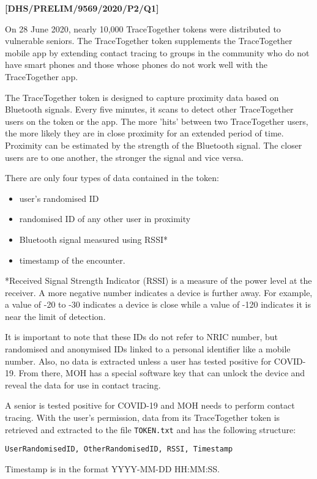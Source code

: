 \item \textbf{{[}DHS/PRELIM/9569/2020/P2/Q1{]} }

On 28 June 2020, nearly 10,000 TraceTogether tokens were distributed
to vulnerable seniors. The TraceTogether token supplements the TraceTogether
mobile app by extending contact tracing to groups in the community
who do not have smart phones and those whose phones do not work well
with the TraceTogether app. 

The TraceTogether token is designed to capture proximity data based
on Bluetooth signals. Every five minutes, it scans to detect other
TraceTogether users on the token or the app. The more 'hits' between
two TraceTogether users, the more likely they are in close proximity
for an extended period of time. Proximity can be estimated by the
strength of the Bluetooth signal. The closer users are to one another,
the stronger the signal and vice versa. 

There are only four types of data contained in the token: 
\begin{itemize}
\item user's randomised ID 
\item randomised ID of any other user in proximity 
\item Bluetooth signal measured using RSSI{*} 
\item timestamp of the encounter. 
\end{itemize}
{*}Received Signal Strength Indicator (RSSI) is a measure of the power
level at the receiver. A more negative number indicates a device is
further away. For example, a value of -20 to -30 indicates a device
is close while a value of -120 indicates it is near the limit of detection. 

It is important to note that these IDs do not refer to NRIC number,
but randomised and anonymised IDs linked to a personal identifier
like a mobile number. Also, no data is extracted unless a user has
tested positive for COVID-19. From there, MOH has a special software
key that can unlock the device and reveal the data for use in contact
tracing. 

A senior is tested positive for COVID-19 and MOH needs to perform
contact tracing. With the user's permission, data from its TraceTogether
token is retrieved and extracted to the file \texttt{TOKEN.txt} and
has the following structure: 

\texttt{UserRandomisedID, OtherRandomisedID, RSSI, Timestamp} 

Timestamp is in the format YYYY-MM-DD HH:MM:SS. 

